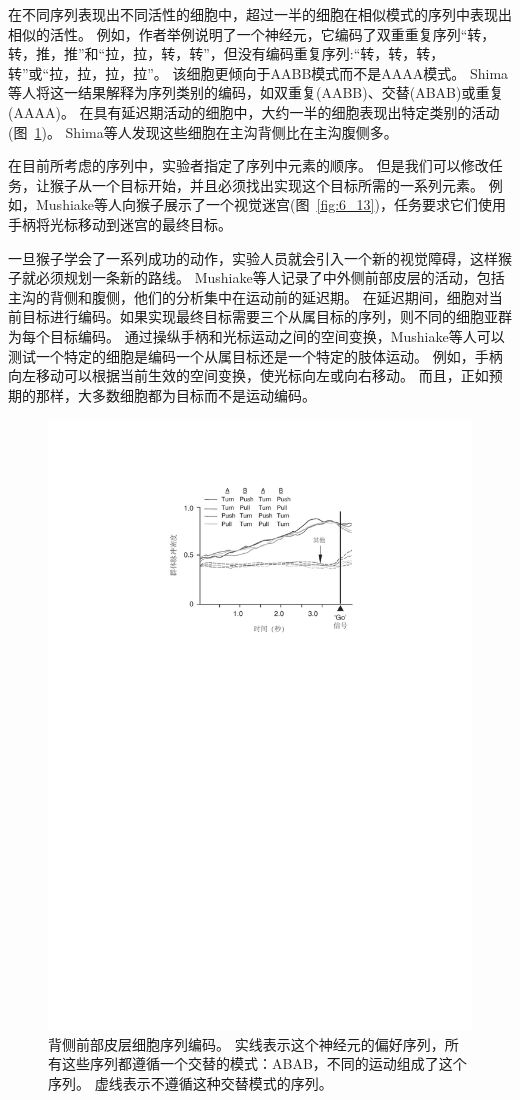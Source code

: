 在不同序列表现出不同活性的细胞中，超过一半的细胞在相似模式的序列中表现出相似的活性。
例如，作者举例说明了一个神经元，它编码了双重重复序列“转，转，推，推”和“拉，拉，转，转”，但没有编码重复序列:“转，转，转，转”或“拉，拉，拉，拉”。
该细胞更倾向于AABB模式而不是AAAA模式。
Shima等人将这一结果解释为序列类别的编码，如双重复(AABB)、交替(ABAB)或重复(AAAA)。
在具有延迟期活动的细胞中，大约一半的细胞表现出特定类别的活动(图~\ref{fig:6_12})。
Shima等人发现这些细胞在主沟背侧比在主沟腹侧多。


在目前所考虑的序列中，实验者指定了序列中元素的顺序。
但是我们可以修改任务，让猴子从一个目标开始，并且必须找出实现这个目标所需的一系列元素。
例如，Mushiake等人\cite{mushiake2001visually}向猴子展示了一个视觉迷宫(图~\ref{fig:6_13})，任务要求它们使用手柄将光标移动到迷宫的最终目标。


一旦猴子学会了一系列成功的动作，实验人员就会引入一个新的视觉障碍，这样猴子就必须规划一条新的路线。
Mushiake等人记录了中外侧前部皮层的活动，包括主沟的背侧和腹侧，他们的分析集中在运动前的延迟期。
在延迟期间，细胞对当前目标进行编码。如果实现最终目标需要三个从属目标的序列，则不同的细胞亚群为每个目标编码\cite{mushiake2006activity}。
通过操纵手柄和光标运动之间的空间变换，Mushiake等人可以测试一个特定的细胞是编码一个从属目标还是一个特定的肢体运动。
例如，手柄向左移动可以根据当前生效的空间变换，使光标向左或向右移动。
而且，正如预期的那样，大多数细胞都为目标而不是运动编码。


\begin{figure}
	\centering
	\includegraphics[width=0.5\linewidth]{chap6/6_12}
	\caption{背侧前部皮层细胞序列编码。
		实线表示这个神经元的偏好序列，所有这些序列都遵循一个交替的模式：ABAB，不同的运动组成了这个序列。
		虚线表示不遵循这种交替模式的序列\cite{shima2007categorization}。}
	\label{fig:6_12}
\end{figure}


